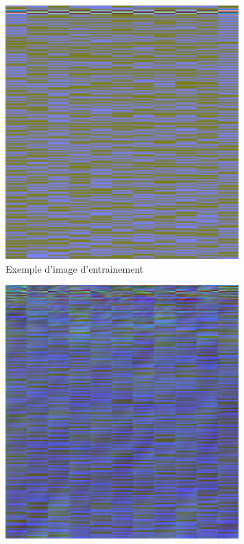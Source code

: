 \begin{figure}[ht]
    \centering
    \begin{subfigure}[b]{0.45\textwidth}
        \includegraphics[width=\textwidth]{logos/real_sample.png}
        \caption{Exemple d'image d'entrainement}
        \label{fig:image1}
    \end{subfigure}
    \hfill %
    \begin{subfigure}[b]{0.45\textwidth}
        \includegraphics[width=\textwidth]{logos/generated_samples1.png}

\end{subfigure}
\end{figure}
